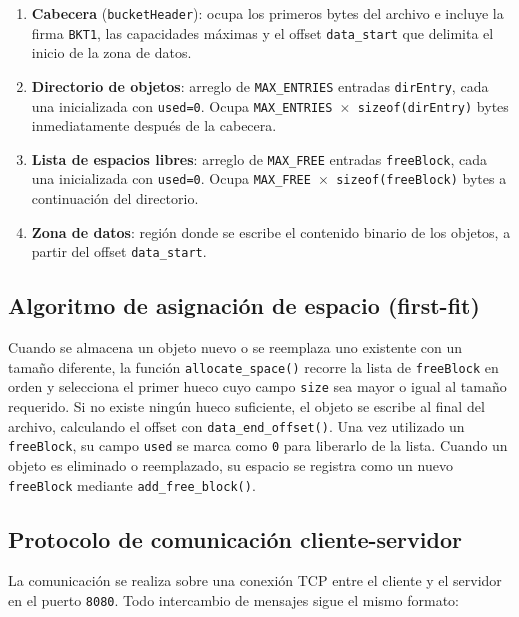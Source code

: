 \documentclass[12pt, letterpaper]{article}
\begin{document}
\begin{enumerate}
    \item \textbf{Cabecera} (\texttt{bucketHeader}): ocupa los primeros 
          bytes del archivo e incluye la firma \texttt{BKT1}, las 
          capacidades máximas y el offset \texttt{data\_start} que delimita 
          el inicio de la zona de datos.
    \item \textbf{Directorio de objetos}: arreglo de \texttt{MAX\_ENTRIES} 
          entradas \texttt{dirEntry}, cada una inicializada con 
          \texttt{used=0}. Ocupa \texttt{MAX\_ENTRIES $\times$ 
          sizeof(dirEntry)} bytes inmediatamente después de la cabecera.
    \item \textbf{Lista de espacios libres}: arreglo de \texttt{MAX\_FREE} 
          entradas \texttt{freeBlock}, cada una inicializada con 
          \texttt{used=0}. Ocupa \texttt{MAX\_FREE $\times$ 
          sizeof(freeBlock)} bytes a continuación del directorio.
    \item \textbf{Zona de datos}: región donde se escribe el contenido 
          binario de los objetos, a partir del offset \texttt{data\_start}.
\end{enumerate}

\subsection{Algoritmo de asignación de espacio (first-fit)}
Cuando se almacena un objeto nuevo o se reemplaza uno existente con un 
tamaño diferente, la función \texttt{allocate\_space()} recorre la lista 
de \texttt{freeBlock} en orden y selecciona el primer hueco cuyo campo 
\texttt{size} sea mayor o igual al tamaño requerido. Si no existe ningún 
hueco suficiente, el objeto se escribe al final del archivo, calculando 
el offset con \texttt{data\_end\_offset()}. Una vez utilizado un 
\texttt{freeBlock}, su campo \texttt{used} se marca como \texttt{0} para 
liberarlo de la lista. Cuando un objeto es eliminado o reemplazado, su 
espacio se registra como un nuevo \texttt{freeBlock} mediante 
\texttt{add\_free\_block()}.

\subsection{Protocolo de comunicación cliente-servidor}
La comunicación se realiza sobre una conexión TCP entre el cliente y el 
servidor en el puerto \texttt{8080}. Todo intercambio de mensajes sigue 
el mismo formato:
\end{document}

